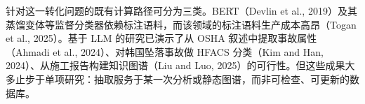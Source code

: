 \documentclass[11pt]{article}
\begin{document}
{\cjkfont 针\allowbreak 对\allowbreak 这\allowbreak 一\allowbreak 转\allowbreak 化\allowbreak 问\allowbreak 题\allowbreak 的\allowbreak 既\allowbreak 有\allowbreak 计\allowbreak 算\allowbreak 路\allowbreak 径\allowbreak 可\allowbreak 分\allowbreak 为\allowbreak 三\allowbreak 类\allowbreak 。}BERT{\cjkfont （}Devlin et al., 2019{\cjkfont ）\allowbreak 及\allowbreak 其\allowbreak 蒸\allowbreak 馏\allowbreak 变\allowbreak 体\allowbreak 等\allowbreak 监\allowbreak 督\allowbreak 分\allowbreak 类\allowbreak 器\allowbreak 依\allowbreak 赖\allowbreak 标\allowbreak 注\allowbreak 语\allowbreak 料\allowbreak ，\allowbreak 而\allowbreak 该\allowbreak 领\allowbreak 域\allowbreak 的\allowbreak 标\allowbreak 注\allowbreak 语\allowbreak 料\allowbreak 生\allowbreak 产\allowbreak 成\allowbreak 本\allowbreak 高\allowbreak 昂\allowbreak （}Togan et al., 2025{\cjkfont ）\allowbreak 。\allowbreak 基\allowbreak 于} LLM {\cjkfont 的\allowbreak 研\allowbreak 究\allowbreak 已\allowbreak 演\allowbreak 示\allowbreak 了\allowbreak 从} OSHA {\cjkfont 叙\allowbreak 述\allowbreak 中\allowbreak 提\allowbreak 取\allowbreak 事\allowbreak 故\allowbreak 属\allowbreak 性\allowbreak （}Ahmadi et al., 2024{\cjkfont ）\allowbreak 、\allowbreak 对\allowbreak 韩\allowbreak 国\allowbreak 坠\allowbreak 落\allowbreak 事\allowbreak 故\allowbreak 做} HFACS {\cjkfont 分\allowbreak 类\allowbreak （}Kim and Han, 2024{\cjkfont ）\allowbreak 、\allowbreak 从\allowbreak 施\allowbreak 工\allowbreak 报\allowbreak 告\allowbreak 构\allowbreak 建\allowbreak 知\allowbreak 识\allowbreak 图\allowbreak 谱\allowbreak （}Liu and Luo, 2025{\cjkfont ）\allowbreak 的\allowbreak 可\allowbreak 行\allowbreak 性\allowbreak 。\allowbreak 但\allowbreak 这\allowbreak 些\allowbreak 成\allowbreak 果\allowbreak 大\allowbreak 多\allowbreak 止\allowbreak 步\allowbreak 于\allowbreak 单\allowbreak 项\allowbreak 研\allowbreak 究\allowbreak ：\allowbreak 抽\allowbreak 取\allowbreak 服\allowbreak 务\allowbreak 于\allowbreak 某\allowbreak 一\allowbreak 次\allowbreak 分\allowbreak 析\allowbreak 或\allowbreak 静\allowbreak 态\allowbreak 图\allowbreak 谱\allowbreak ，\allowbreak 而\allowbreak 非\allowbreak 可\allowbreak 检\allowbreak 查\allowbreak 、\allowbreak 可\allowbreak 更\allowbreak 新\allowbreak 的\allowbreak 数\allowbreak 据\allowbreak 库\allowbreak 。}
\end{document}

